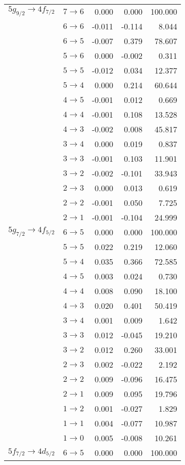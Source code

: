 \begin{longtable}{cc|rrr}
$5g_{9/2} \rightarrow 4f_{7/2}$ & $7 \rightarrow 6$ &0.000&0.000&100.000\\
 & $6 \rightarrow 6$ &-0.011&-0.114&8.044\\
 & $6 \rightarrow 5$ &-0.007&0.379&78.607\\
 & $5 \rightarrow 6$ &0.000&-0.002&0.311\\
 & $5 \rightarrow 5$ &-0.012&0.034&12.377\\
 & $5 \rightarrow 4$ &0.000&0.214&60.644\\
 & $4 \rightarrow 5$ &-0.001&0.012&0.669\\
 & $4 \rightarrow 4$ &-0.001&0.108&13.528\\
 & $4 \rightarrow 3$ &-0.002&0.008&45.817\\
 & $3 \rightarrow 4$ &0.000&0.019&0.837\\
 & $3 \rightarrow 3$ &-0.001&0.103&11.901\\
 & $3 \rightarrow 2$ &-0.002&-0.101&33.943\\
 & $2 \rightarrow 3$ &0.000&0.013&0.619\\
 & $2 \rightarrow 2$ &-0.001&0.050&7.725\\
 & $2 \rightarrow 1$ &-0.001&-0.104&24.999\\[4pt]
$5g_{7/2} \rightarrow 4f_{5/2}$ & $6 \rightarrow 5$ &0.000&0.000&100.000\\
 & $5 \rightarrow 5$ &0.022&0.219&12.060\\
 & $5 \rightarrow 4$ &0.035&0.366&72.585\\
 & $4 \rightarrow 5$ &0.003&0.024&0.730\\
 & $4 \rightarrow 4$ &0.008&0.090&18.100\\
 & $4 \rightarrow 3$ &0.020&0.401&50.419\\
 & $3 \rightarrow 4$ &0.001&0.009&1.642\\
 & $3 \rightarrow 3$ &0.012&-0.045&19.210\\
 & $3 \rightarrow 2$ &0.012&0.260&33.001\\
 & $2 \rightarrow 3$ &0.002&-0.022&2.192\\
 & $2 \rightarrow 2$ &0.009&-0.096&16.475\\
 & $2 \rightarrow 1$ &0.009&0.095&19.796\\
 & $1 \rightarrow 2$ &0.001&-0.027&1.829\\
 & $1 \rightarrow 1$ &0.004&-0.077&10.987\\
 & $1 \rightarrow 0$ &0.005&-0.008&10.261\\[4pt]
$5f_{7/2} \rightarrow 4d_{5/2}$ & $6 \rightarrow 5$ &0.000&0.000&100.000\\

\end{longtable}
